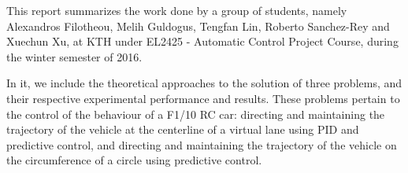 This report summarizes the work done by a group of students, namely Alexandros
Filotheou, Melih Guldogus, Tengfan Lin, Roberto Sanchez-Rey and Xuechun Xu,
at KTH under EL2425 - Automatic Control Project Course, during the winter
semester of 2016.

In it, we include the theoretical approaches to the solution of
three problems, and their respective experimental performance and results.
These problems pertain to the control of the behaviour of a F1/10 RC car:
directing and maintaining the trajectory of the vehicle at the centerline of
a virtual lane using PID and predictive control, and directing and maintaining
the trajectory of the vehicle on the circumference of a circle using
predictive control.
